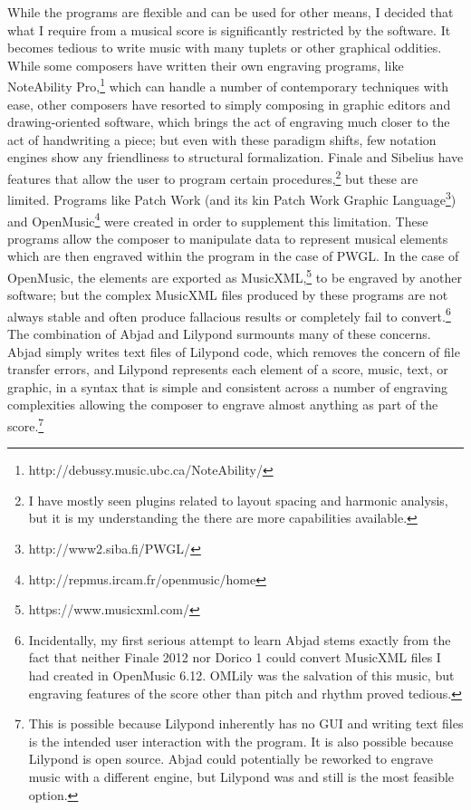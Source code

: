 While the programs are flexible and can be used for other means, I decided that what I require from a musical score is significantly restricted by the software. It becomes tedious to write music with many tuplets or other graphical oddities. While some composers have written their own engraving programs, like NoteAbility Pro,\footnote{http://debussy.music.ubc.ca/NoteAbility/} which can handle a number of contemporary techniques with ease, other composers have resorted to simply composing in graphic editors and drawing-oriented software, which brings the act of engraving much closer to the act of handwriting a piece; but even with these paradigm shifts, few notation engines show any friendliness to structural formalization. Finale and Sibelius have features that allow the user to program certain procedures,\footnote{I have mostly seen plugins related to layout spacing and harmonic analysis, but it is my understanding the there are more capabilities available.} but these are limited. Programs like Patch Work (and its kin Patch Work Graphic Language\footnote{http://www2.siba.fi/PWGL/}) and OpenMusic\footnote{http://repmus.ircam.fr/openmusic/home} were created in order to supplement this limitation. These programs allow the composer to manipulate data to represent musical elements which are then engraved within the program in the case of PWGL. In the case of OpenMusic, the elements are exported as MusicXML,\footnote{https://www.musicxml.com/} to be engraved by another software; but the complex MusicXML files produced by these programs are not always stable and often produce fallacious results or completely fail to convert.\footnote{Incidentally, my first serious attempt to learn Abjad stems exactly from the fact that neither Finale 2012 nor Dorico 1 could convert MusicXML files I had created in OpenMusic 6.12. OMLily was the salvation of this music, but engraving features of the score other than pitch and rhythm proved tedious.} The combination of Abjad and Lilypond surmounts many of these concerns. Abjad simply writes text files of Lilypond code, which removes the concern of file transfer errors, and Lilypond represents each element of a score, music, text, or graphic, in a syntax that is simple and consistent across a number of engraving complexities allowing the composer to engrave almost anything as part of the score.\footnote{This is possible because Lilypond inherently has no GUI and writing text files is the intended user interaction with the program. It is also possible because Lilypond is open source. Abjad could potentially be reworked to engrave music with a different engine, but Lilypond was and still is the most feasible option.} 

